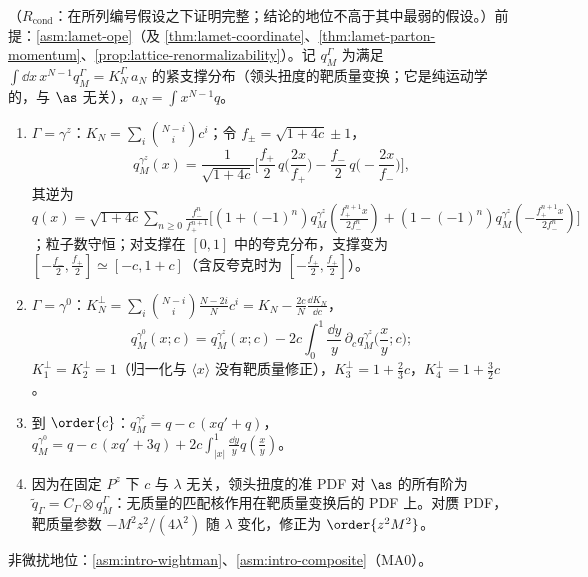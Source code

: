 \begin{proposition}\label{prop:lamet-tmc}
（$R_{\mathrm{cond}}$：在所列编号假设之下证明完整；结论的地位不高于其中最弱的假设。）前提：\cref{asm:lamet-ope}（及 \cref{thm:lamet-coordinate}、\cref{thm:lamet-parton-momentum}、\cref{prop:lattice-renormalizability}）。记 $q^\Gamma_M$ 为满足 $\int\dd x\,x^{N-1}q^\Gamma_M=K^\Gamma_N\,a_N$ 的紧支撑分布（领头扭度的靶质量变换；它是纯运动学的，与 $\as$ 无关），$a_N=\int x^{N-1}q$。
\begin{enumerate}[label=(\alph*),leftmargin=2em,itemsep=1pt,topsep=2pt]
\item $\Gamma=\gamma^z$：$K_N=\sum_i\binom{N-i}ic^i$；令 $f_\pm=\sqrt{1+4c}\pm1$，
\begin{equation}\label{eq:lamet-tmc-z}
q^{\gamma^z}_M(x)=\frac1{\sqrt{1+4c}}\Big[\frac{f_+}2\,q\Big(\frac{2x}{f_+}\Big)-\frac{f_-}2\,q\Big(-\frac{2x}{f_-}\Big)\Big],
\end{equation}%
其逆为 $q(x)=\sqrt{1+4c}\sum_{n\ge0}\frac{f_-^n}{f_+^{n+1}}\big[(1+(-1)^n)q^{\gamma^z}_M(\frac{f_+^{n+1}x}{2f_-^n})+(1-(-1)^n)q^{\gamma^z}_M(-\frac{f_+^{n+1}x}{2f_-^n})\big]$；粒子数守恒；对支撑在 $[0,1]$ 中的夸克分布，支撑变为 $[-\frac{f_-}2,\frac{f_+}2]\simeq[-c,1+c]$（含反夸克时为 $[-\frac{f_+}2,\frac{f_+}2]$）。
\item $\Gamma=\gamma^0$：$K^\perp_N=\sum_i\binom{N-i}i\frac{N-2i}Nc^i=K_N-\frac{2c}N\frac{\dd K_N}{\dd c}$，
\begin{equation}\label{eq:lamet-tmc-0}
q^{\gamma^0}_M(x;c)=q^{\gamma^z}_M(x;c)-2c\int_0^1\frac{\dd y}y\,\partial_c q^{\gamma^z}_M\Big(\frac xy;c\Big);
\end{equation}
$K^\perp_1=K^\perp_2=1$（归一化与 $\langle x\rangle$ 没有靶质量修正），$K^\perp_3=1+\frac23c$，$K^\perp_4=1+\frac32c$。
\item 到 $\order{c}$：$q^{\gamma^z}_M=q-c\,(xq'+q)$，$q^{\gamma^0}_M=q-c\,(xq'+3q)+2c\int_{|x|}^1\frac{\dd y}yq(\frac xy)$。
\item 因为在固定 $P^z$ 下 $c$ 与 $\lambda$ 无关，领头扭度的准 PDF 对 $\as$ 的所有阶为 $\tilde q_\Gamma=C_\Gamma\otimes q^\Gamma_M$：无质量的匹配核作用在靶质量变换后的 PDF 上。对赝 PDF，靶质量参数 $-M^2z^2/(4\lambda^2)$ 随 $\lambda$ 变化，修正为 $\order{z^2M^2}$。
\end{enumerate}
非微扰地位：\cref{asm:intro-wightman}、\cref{asm:intro-composite}（MA0）。
\end{proposition}

